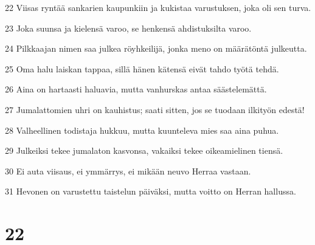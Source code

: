 \par 22 Viisas ryntää sankarien kaupunkiin ja kukistaa varustuksen, joka oli sen turva.
\par 23 Joka suunsa ja kielensä varoo, se henkensä ahdistuksilta varoo.
\par 24 Pilkkaajan nimen saa julkea röyhkeilijä, jonka meno on määrätöntä julkeutta.
\par 25 Oma halu laiskan tappaa, sillä hänen kätensä eivät tahdo työtä tehdä.
\par 26 Aina on hartaasti haluavia, mutta vanhurskas antaa säästelemättä.
\par 27 Jumalattomien uhri on kauhistus; saati sitten, jos se tuodaan ilkityön edestä!
\par 28 Valheellinen todistaja hukkuu, mutta kuunteleva mies saa aina puhua.
\par 29 Julkeiksi tekee jumalaton kasvonsa, vakaiksi tekee oikeamielinen tiensä.
\par 30 Ei auta viisaus, ei ymmärrys, ei mikään neuvo Herraa vastaan.
\par 31 Hevonen on varustettu taistelun päiväksi, mutta voitto on Herran hallussa.

\chapter{22}

